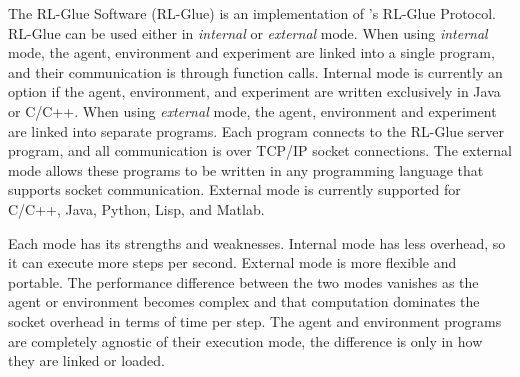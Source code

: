 \documentclass[twoside,11pt]{article}
\begin{document}
The RL-Glue Software (RL-Glue) is an implementation of \citeauthor{whiteThesis}'s RL-Glue Protocol.  RL-Glue can be used either in {\it internal} or {\it external} mode.  When using \textit{internal} mode, the agent, environment and experiment are linked into a single program, and their communication is through function calls.  Internal mode is currently an option if the agent, environment, and experiment are written exclusively in Java or C/C++.  When using  \textit{external} mode, the agent, environment and experiment are linked into separate programs.  Each program connects to the RL-Glue server program, and all communication is over TCP/IP socket connections. The external mode allows these programs to be written in any programming language that supports socket communication.  External mode is currently supported for C/C++, Java, Python, Lisp, and Matlab.

Each mode has its strengths and weaknesses. Internal mode has less overhead, so it can execute more steps per second. External mode is more flexible and portable.  The performance difference between the two modes vanishes as the agent or environment becomes complex and that computation dominates the socket overhead in terms of time per step.  The agent and environment programs are completely agnostic of their execution mode, the difference is only in how they are linked or loaded.



\end{document}

